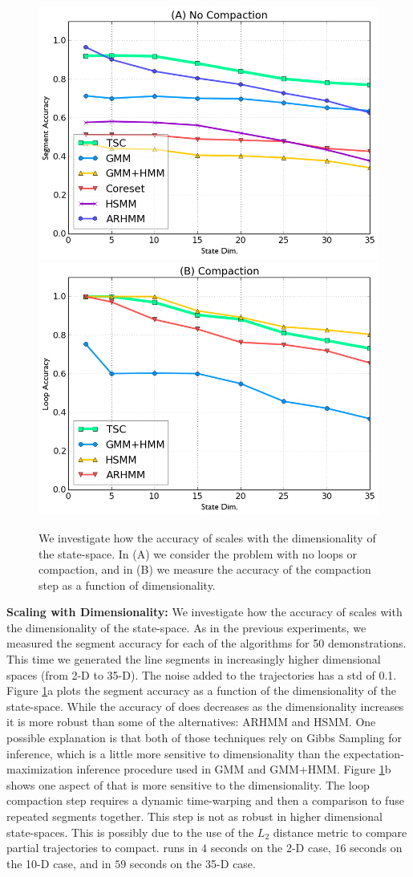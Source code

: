 \begin{figure}[ht]
\centering
\includegraphics[width=0.48\columnwidth]{tsc-experiments/exp11.png}
\includegraphics[width=0.48\columnwidth]{tsc-experiments/exp12.png}
\caption{We investigate how the accuracy of \tsc scales with the dimensionality of the state-space. In (A) we consider the problem with no loops or compaction, and in  (B) we measure the accuracy of the compaction step as a function of dimensionality. \label{exps}}
\end{figure}

\textbf{Scaling with Dimensionality: }
We investigate how the accuracy of \tsc scales with the dimensionality of the state-space.
As in the previous experiments, we measured the segment accuracy for each of the algorithms for 50 demonstrations.
This time we generated the line segments in increasingly higher dimensional spaces (from 2-D to 35-D).
The noise added to the trajectories has a std of 0.1.
Figure \ref{exps}a plots the segment accuracy as a function of the dimensionality of the state-space.
While the accuracy of \tsc does decreases as the dimensionality increases it is more robust than some of the alternatives: ARHMM and HSMM.
One possible explanation is that both of those techniques rely on Gibbs Sampling for inference, which is a little more sensitive to dimensionality than the expectation-maximization inference procedure used in GMM and GMM+HMM.
Figure \ref{exps}b shows one aspect of \tsc that is more sensitive to the dimensionality.
The loop compaction step requires a dynamic time-warping and then a comparison to fuse repeated segments together.
This step is not as robust in higher dimensional state-spaces.
This is possibly due to the use of the $L_2$ distance metric to compare partial trajectories to compact.
\tsc runs in $4$ seconds on the 2-D case, $16$ seconds on the 10-D case, and in $59$ seconds on the 35-D case. 



